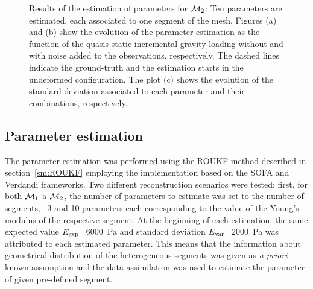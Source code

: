 \begin{figure}[t!]%
\centering%
\hfill
{}
\hfill
{}
\caption{Results of the estimation of parameters for $\mathcal{M}_2$: Ten parameters are estimated, each associated to 
one segment of the mesh. Figures (a) and (b) show the evolution of the parameter estimation as the function of the quasis-static 
incremental gravity loading without and with noise added to the observations, respectively. The dashed lines indicate the ground-truth 
and the estimation starts in the undeformed configuration. The plot (c) shows the evolution of the standard deviation 
associated to each parameter and their combinations, respectively.}%
\label{f:cyl10Estim}
\end{figure}

\subsection{Parameter estimation}
\label{sr:estim}
The parameter estimation was performed using the ROUKF method described 
in section~\ref{sm:ROUKF} employing the implementation based on the SOFA and Verdandi frameworks. 
Two different reconstruction scenarios were tested: first, for both $\mathcal{M}_1$ a $\mathcal{M}_2$, the number of parameters to estimate was 
set to the number of segments, \ie\ 3 and 10 parameters each corresponding to the value of the Young's modulus of the respective segment. 
At the beginning of each estimation, the same expected value $E_\text{exp}$=\SI{6000}{\Pa} and standard deviation $E_\text{var}$=\SI{2000}{\Pa} was attributed to 
each estimated parameter. This means that the information about geometrical distribution of the heterogeneous segments was 
given as \emph{a priori} known assumption and the data assimilation was used to estimate the parameter of given pre-defined segment.


